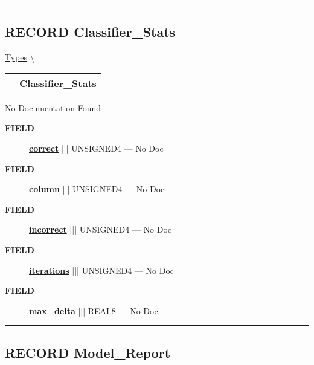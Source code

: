 \rule{\linewidth}{0.5pt}
\subsection*{\textsf{\colorbox{headtoc}{\color{white} RECORD}
Classifier\_Stats}}

\hypertarget{ecldoc:logisticregression.types.classifier_stats}{}
\hspace{0pt} \hyperlink{ecldoc:LogisticRegression.Types}{Types} \textbackslash 

{\renewcommand{\arraystretch}{1.5}
\begin{tabularx}{\textwidth}{|>{\raggedright\arraybackslash}l|X|}
\hline
\hspace{0pt}\mytexttt{\color{red} } & \textbf{Classifier\_Stats} \\
\hline
\end{tabularx}
}

\par





No Documentation Found







\par
\begin{description}
\item [\colorbox{tagtype}{\color{white} \textbf{\textsf{FIELD}}}] \textbf{\underline{correct}} ||| UNSIGNED4 --- No Doc
\item [\colorbox{tagtype}{\color{white} \textbf{\textsf{FIELD}}}] \textbf{\underline{column}} ||| UNSIGNED4 --- No Doc
\item [\colorbox{tagtype}{\color{white} \textbf{\textsf{FIELD}}}] \textbf{\underline{incorrect}} ||| UNSIGNED4 --- No Doc
\item [\colorbox{tagtype}{\color{white} \textbf{\textsf{FIELD}}}] \textbf{\underline{iterations}} ||| UNSIGNED4 --- No Doc
\item [\colorbox{tagtype}{\color{white} \textbf{\textsf{FIELD}}}] \textbf{\underline{max\_delta}} ||| REAL8 --- No Doc
\end{description}





\rule{\linewidth}{0.5pt}
\subsection*{\textsf{\colorbox{headtoc}{\color{white} RECORD}
Model\_Report}}

